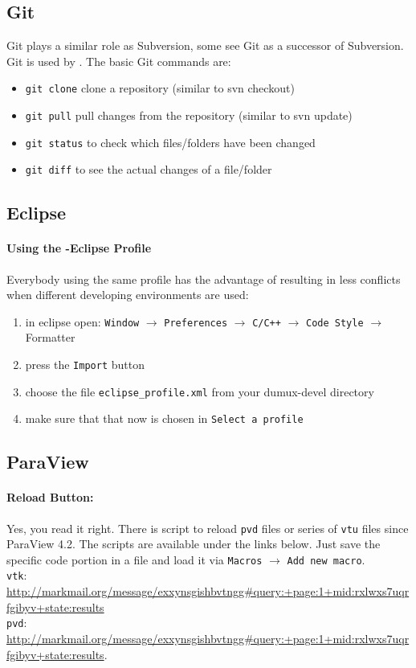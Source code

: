 \subsection{Git}
Git plays a similar role as Subversion, some see Git as a successor of Subversion. Git is used by \Dune. The basic
Git commands are:
\begin{itemize}
  \item \texttt{git clone} clone a repository (similar to svn checkout)
  \item \texttt{git pull} pull changes from the repository (similar to svn update)
  \item \texttt{git status} to check which files/folders have been changed
  \item \texttt{git diff} to see the actual changes of a file/folder
\end{itemize}

\subsection{Eclipse}
\paragraph{Using the \Dumux-Eclipse Profile}
Everybody using the same profile has the advantage of resulting in less conflicts
when different developing environments are used:
\begin{enumerate}
  \item in eclipse open: \texttt{Window} $\rightarrow$ \texttt{Preferences} $\rightarrow$ \texttt{C/C++}  $\rightarrow$ \texttt{Code Style} $\rightarrow$ Formatter
  \item press the \texttt{Import} button
  \item choose the file \texttt{eclipse\_profile.xml} from your dumux-devel directory
  \item make sure that that now \Dumux is chosen in \texttt{Select a profile}
\end{enumerate}


\subsection{ParaView}
\paragraph{Reload Button:}
Yes, you read it right. There is script to reload \texttt{pvd} files or
series of \texttt{vtu} files since ParaView 4.2. The scripts are available
under the links below. Just save the specific code portion in a file and load
it via \texttt{Macros} $\rightarrow$ \texttt{Add new macro}.\\
\texttt{vtk}: \url{http://markmail.org/message/exxynsgishbvtngg#query:+page:1+mid:rxlwxs7uqrfgibyv+state:results}\\
\texttt{pvd}: \url{http://markmail.org/message/exxynsgishbvtngg#query:+page:1+mid:rxlwxs7uqrfgibyv+state:results}.

